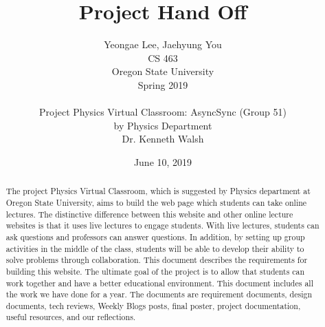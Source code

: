 \documentclass[10pt]{article}
\begin{document}
\begin{titlepage}
    \title{Project Hand Off}
    \author{Yeongae Lee, Jaehyung You \\ CS 463  \\ Oregon State University \\ Spring 2019 \\ \\ Project Physics Virtual Classroom: AsyncSync (Group 51) \\by Physics Department \\Dr. Kenneth Walsh}
    \date {June 10, 2019}


    \maketitle
        \begin{abstract}
            The project Physics Virtual Classroom, which is suggested by Physics department at Oregon State University, aims to build the web page which students can take online lectures. The distinctive difference between this website and other online lecture websites is that it uses live lectures to engage students. With live lectures, students can ask questions and professors can answer questions. In addition, by setting up group activities in the middle of the class, students will be able to develop their ability to solve problems through collaboration. This document describes the requirements for building this website. The ultimate goal of the project is to allow that students can work together and have a better educational environment.
            This document includes all the work we have done for a year. The documents are requirement documents, design documents, tech reviews, Weekly Blogs posts, final poster, project documentation, useful resources, and our reflections.




        \end{abstract}
\end{titlepage}
\newpage
{}

\tableofcontents
\newpage
\end{document}

